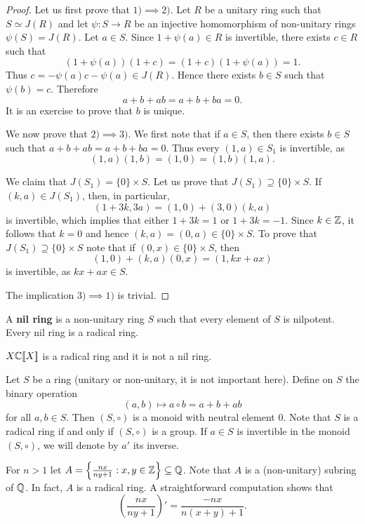 \begin{proof}
    Let us first prove that $1)\implies2)$. Let $R$ be a unitary ring such that 
    $S\simeq J(R)$ and let $\psi\colon S\rightarrow R$ be an injective homomorphism 
    of non-unitary rings $\psi(S)=J(R)$. Let $a\in S$. Since  
    $1+\psi(a)\in R$ is invertible, there exists $c\in R$ such that 
    \[
    (1+\psi(a))(1+c)=(1+c)(1+\psi(a))=1.
    \]
    Thus 
    $c=-\psi(a)c-\psi(a)\in J(R)$. 
    Hence there exists $b\in S$ such that $\psi(b)=c$. Therefore 
    \[
    a+b+ab=a+b+ba=0.
    \]
    It is an exercise to prove that $b$ is unique. 
    
    We now prove that $2)\implies 3)$. We first note that if 
    $a\in S$, then there exists $b\in S$ such that $a+b+ab=a+b+ba=0$. 
    Thus every 
    $(1,a)\in S_1$ is invertible, as 
    \[
    (1,a)(1,b)=(1,0)=(1,b)(1,a).
    \]

    We claim that $J(S_1)=\{0\}\times S$. Let us prove that 
    $J(S_1)\supseteq \{0\}\times S$. If $(k,a)\in J(S_1)$, then, in particular, 
    \[
    (1+3k,3a)=(1,0)+(3,0)(k,a)
    \]
    is invertible, which implies that either $1+3k=1$ or $1+3k=-1$. Since
    $k\in\mathbb{Z}$, it follows that $k=0$ and hence $(k,a)=(0,a)\in\{0\}\times S$. 
    To prove that 
    $J(S_1)\supseteq \{0\}\times S$ note that
    if $(0,x)\in\{0\}\times S$, then
    \[
    (1,0)+(k,a)(0,x)=(1,kx+ax)
    \]
    is invertible, as $kx+ax\in S$. 
    
    The implication $3)\implies1)$ is trivial.
\end{proof}

A \textbf{nil ring} is a non-unitary ring $S$ such that every 
element of $S$ is nilpotent. Every nil ring is a radical ring.

\begin{example} 
    $X\mathbb{C}[\![X]\!]$ is a radical ring and it is not a nil ring.
\end{example}

Let $S$ be a ring (unitary or non-unitary, it is not important here). 
Define on $S$ the binary operation 
\[
(a,b)\mapsto a\circ b=a+b+ab
\]
for all $a,b\in S$. Then $(S,\circ)$ is a monoid with neutral element $0$.
Note that $S$ is a radical ring if and only if $(S,\circ)$ is a group. 
If $a\in S$ is invertible in the monoid $(S,\circ)$, we will denote by $a'$ its inverse.

\begin{example}
	For $n>1$ let $A=\left\{\frac{nx}{ny+1}:x,y\in\mathbb{Z}\right\}\subseteq \mathbb{Q}$. 
	Note that $A$ is a (non-unitary) subring of $\mathbb{Q}$. In fact, $A$ is a radical ring. A straightforward computation shows that 
	\[
	\left(\frac{nx}{ny+1}\right)'=\frac{-nx}{n(x+y)+1}.
	\]
\end{example}

